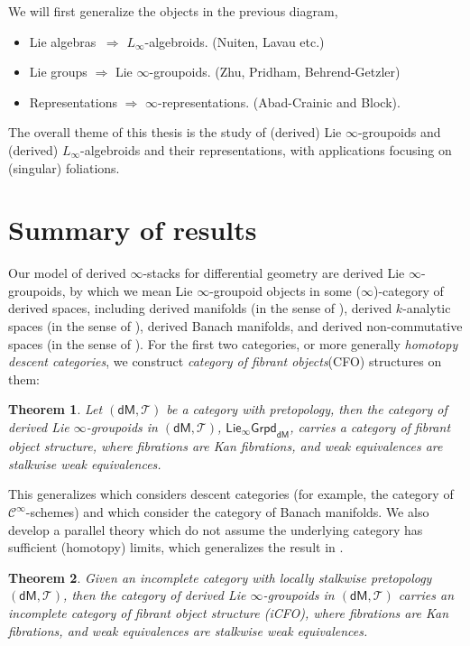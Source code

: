 \documentclass[12pt]{amsart}
\newtheorem{theorem}{Theorem}[section]
\theoremstyle{definition}
\theoremstyle{remark}
\numberwithin{equation}{section}
\newcommand{\cinf}{{\mathcal C}^{\infty}}
\newcommand{\1}{{\mathbb{1}}}
\newcommand{\dm}{\mathsf{dM}}
\newcommand{\ilgpd}{\mathsf{Lie_{\infty}Grpd}}
\begin{document}
	We will first generalize the objects in the previous diagram,
    \begin{itemize}
        \item Lie algebras $\	\Rightarrow$ $L_{\infty}$-algebroids. (Nuiten, Lavau etc.)
        \item Lie groups $\Rightarrow$ Lie ${\infty}$-groupoids. (Zhu, Pridham, Behrend-Getzler)
        \item Representations $\Rightarrow$ $\infty$-representations. (Abad-Crainic and Block).
    \end{itemize}
    
    The overall theme of this thesis is the study of (derived) Lie $\infty$-groupoids and (derived) $L_{\infty}$-algebroids and their representations, with applications focusing on (singular) foliations.
	
	

\section{Summary of results}
Our model of derived $\infty$-stacks for differential geometry are derived Lie $\infty$-groupoids, by which we mean Lie $\infty$-groupoid objects in some ($\infty$)-category of derived spaces, including derived manifolds (in the sense of \cite{Nui18}), derived $k$-analytic spaces (in the sense of \cite{Pri20b}), derived Banach manifolds, and derived non-commutative spaces (in the sense of \cite{Pri20c}). For the first two categories, or more generally {\it homotopy descent categories}, we construct {\it category of fibrant objects}(CFO) structures on them:
\begin{theorem}
   Let $(\dm, \mathcal{T})$ be a category with pretopology, then the category of derived Lie $\infty$-groupoids in $(\dm, \mathcal{T})$, $\ilgpd_{\dm}$,  carries a category of fibrant object structure, where fibrations are Kan fibrations, and weak equivalences are stalkwise weak equivalences.
\end{theorem}
This generalizes \cite{BG17} which considers descent categories (for example, the category of $\cinf$-schemes) and \cite{RZ20} which consider the category of Banach manifolds. We also develop a parallel theory which do not assume the underlying category has sufficient (homotopy) limits, which generalizes the result in \cite{RZ20}.

\begin{theorem}
     Given an incomplete category with locally stalkwise pretopology $(\dm, \mathcal{T})$, then the category of derived Lie $\infty$-groupoids in $(\dm, \mathcal{T})$ carries an incomplete category of fibrant object structure (iCFO), where fibrations are Kan fibrations, and weak equivalences are stalkwise weak equivalences.
\end{theorem}
\end{document}

